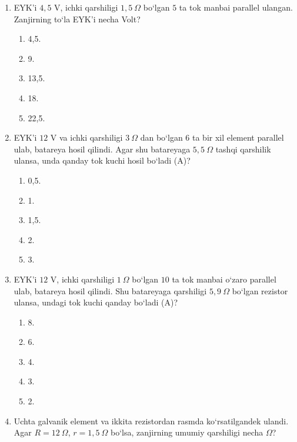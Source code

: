\begin{enumerate}
\item EYK’i $4,5$ V, ichki qarshiligi $1,5~\Omega$ bo‘lgan $5$ ta tok manbai parallel ulangan. Zanjirning to‘la EYK’i necha Volt?
\begin{enumerate}[label=\Alph*)]
\item 4,5.
\item 9.
\item 13,5.
\item 18.
\item 22,5.
\end{enumerate}

\item EYK’i $12$ V va ichki qarshiligi $3~\Omega$ dan bo‘lgan $6$ ta bir xil element parallel ulab, batareya hosil qilindi. Agar shu batareyaga $5,5~\Omega$ tashqi qarshilik ulansa, unda qanday tok kuchi hosil bo‘ladi (A)?
\begin{enumerate}[label=\Alph*)]
\item 0,5.
\item 1.
\item 1,5.
\item 2.
\item 3.
\end{enumerate}

\item EYK’i $12$ V, ichki qarshiligi $1~\Omega$ bo‘lgan $10$ ta tok manbai o‘zaro parallel ulab, batareya hosil qilindi. Shu batareyaga qarshiligi $5,9~\Omega$ bo‘lgan rezistor ulansa, undagi tok kuchi qanday bo‘ladi (A)?
\begin{enumerate}[label=\Alph*)]
\item 8.
\item 6.
\item 4.
\item 3.
\item 2.
\end{enumerate}

\item Uchta galvanik element va ikkita rezistordan rasmda ko‘rsatilgandek ulandi. Agar $R=12~\Omega$, $r=1,5~\Omega$ bo‘lsa, zanjirning umumiy qarshiligi necha $\Omega$?

\end{enumerate}
